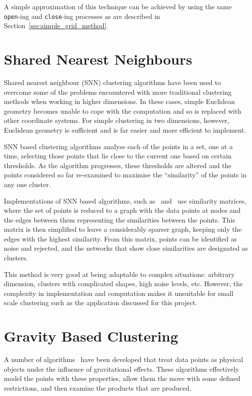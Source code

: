 A simple approximation of this technique can be achieved by using the same
\texttt{open}-ing and \texttt{close}-ing processes as are described in
Section~\ref{sec:simple_grid_method}.

\section{Shared Nearest Neighbours}
\label{sec:shared_nearest_neighbours}

Shared nearest neighbour (SNN) clustering algorithms have been used to overcome
some of the problems encountered with more traditional clustering methods when
working in higher dimensions. In these cases, simple Euclidean geometry becomes
unable to cope with the computation and so is replaced with other coordinate
systems. For simple clustering in two dimensions, however, Euclidean geometry
is sufficient and is far easier and more efficient to implement.

SNN based clustering algorithms analyse each of the points in a set, one at a
time, selecting those points that lie close to the current one based on certain
thresholds. As the algorithm progresses, these thresholds are altered and the
points considered so far re-examined to maximise the ``similarity'' of the
points in any one cluster.

Implementations of SNN based algorithms, such as~\cite{jarvis1973clustering}
and~\cite{ertoz2002new} use similarity matrices, where the set of points is
reduced to a graph with the data points at nodes and the edges between them
representing the similarities between the points. This matrix is then
simplified to leave a considerably sparser graph, keeping only the edges with
the highest similarity. From this matrix, points can be identified as noise and
rejected, and the networks that show close similarities are designated as
clusters.

This method is very good at being adaptable to complex situations: arbitrary
dimension, clusters with complicated shapes, high noise levels, etc. However,
the complexity in implementation and computation makes it unsuitable for small
scale clustering such as the application discussed for this project.

\section{Gravity Based Clustering}
\label{sec:gravity_based_clustering}

A number of algorithms~\cite{zhong2010novel} have been developed that treat
data points as physical objects under the influence of gravitational effects.
These algorithms effectively model the points with these properties, allow them
the move with some defined restrictions, and then examine the products that are
produced.

